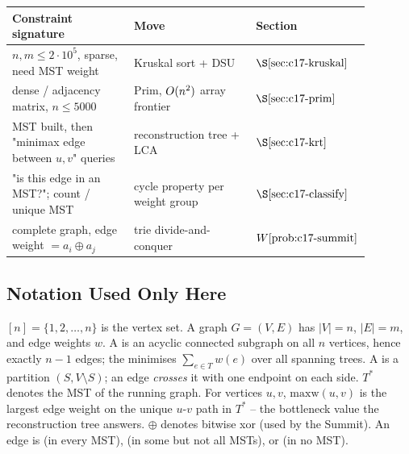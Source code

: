 \begin{center}
\renewcommand{\arraystretch}{1.2}
\setlength{\tabcolsep}{3pt}
\begin{tabular}{@{}p{0.34\linewidth} p{0.34\linewidth} >{\raggedright\arraybackslash}p{0.20\linewidth}@{}}
\toprule
\textbf{Constraint signature} & \textbf{Move} & \textbf{Section}\\
\midrule
\(n,m\le 2\cdot 10^5\), sparse, need MST weight & Kruskal sort + DSU & \(\secref{c17-kruskal}\)\\
dense / adjacency matrix, \(n\le 5000\) & Prim, \(O(n^2)\) array frontier & \(\secref{c17-prim}\)\\
MST built, then "minimax edge between \(u,v\)" queries & reconstruction tree + LCA & \(\secref{c17-krt}\)\\
"is this edge in an MST?"; count / unique MST & cycle property per weight group & \(\secref{c17-classify}\)\\
complete graph, edge weight \(=a_i \oplus a_j\) & trie divide-and-conquer & \(\probref{c17-summit}\)\\
\bottomrule
\end{tabular}
\end{center}

\subsection*{Notation Used Only Here}

\([n]=\{1,2,\dots,n\}\) is the vertex set.  A graph \(G=(V,E)\) has \(|V|=n\),
\(|E|=m\), and edge weights \(w\).  A  is an acyclic
connected subgraph on all \(n\) vertices, hence exactly \(n-1\) edges; the
 minimises \(\sum_{e\in T} w(e)\) over all spanning
trees.  A  is a partition \((S, V\setminus S)\); an edge \emph{crosses}
it with one endpoint on each side.  \(T^{*}\) denotes the MST of the running
graph.  For vertices \(u,v\), \(\mathrm{maxw}(u,v)\) is the largest edge weight on the
unique \(u\)-\(v\) path in \(T^{*}\) -- the bottleneck value the reconstruction
tree answers.  \(\oplus\) denotes bitwise xor (used by the Summit).  An edge is
 (in every MST),  (in some but not all MSTs), or
 (in no MST).
